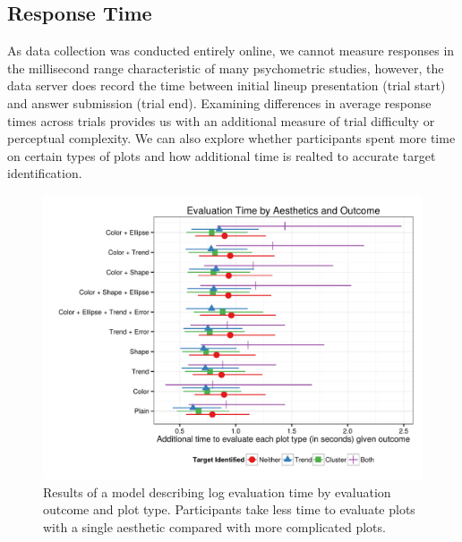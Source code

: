 \documentclass[11pt]{isuthesis}\usepackage[]{graphicx}\usepackage[]{color}
\newenvironment{knitrout}{}{} %
\begin{document}
\subsection{Response Time}
As data collection was conducted entirely online, we cannot measure responses in the millisecond range characteristic of many psychometric studies, however, the data server does record the time between initial lineup presentation (trial start) and answer submission (trial end). 
Examining differences in average response times across trials provides us with an additional measure of trial difficulty or perceptual complexity. 
We can also explore whether participants spent more time on certain types of plots and how additional time is realted to accurate target identification. 

\begin{figure}[ht]\centering
\begin{knitrout}
\color{fgcolor}

{\centering \includegraphics[width=\linewidth]{Figure/FeatureHierarchy/fig-timemodel-plottype-1} 

}



\end{knitrout}
\caption[Log evaluation time by outcome and plot aesthetics]{\label{fig:timemodel-aes} Results of a model describing log evaluation time by evaluation outcome and plot type. Participants take less time to evaluate plots with a single aesthetic compared with more complicated plots. }
\end{figure}
\end{document}

